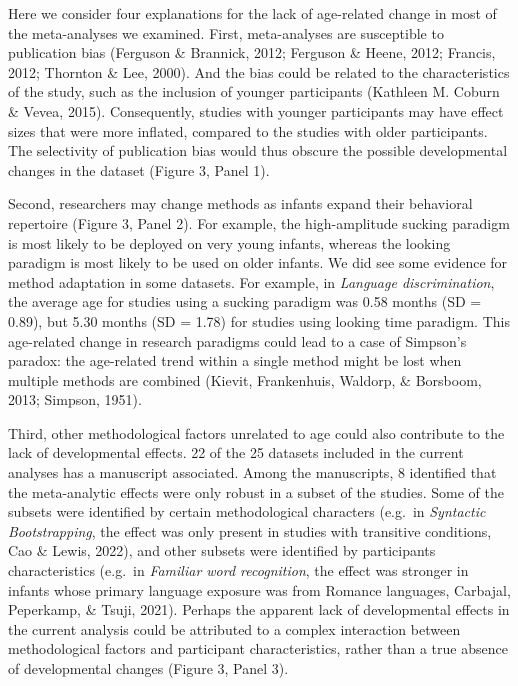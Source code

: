 \documentclass[
  man]{apa6}
\begin{document}
Here we consider four explanations for the lack of age-related change in most of the meta-analyses we examined. First, meta-analyses are susceptible to publication bias (Ferguson \& Brannick, 2012; Ferguson \& Heene, 2012; Francis, 2012; Thornton \& Lee, 2000). And the bias could be related to the characteristics of the study, such as the inclusion of younger participants (Kathleen M. Coburn \& Vevea, 2015). Consequently, studies with younger participants may have effect sizes that were more inflated, compared to the studies with older participants. The selectivity of publication bias would thus obscure the possible developmental changes in the dataset (Figure 3, Panel 1).

Second, researchers may change methods as infants expand their behavioral repertoire (Figure 3, Panel 2). For example, the high-amplitude sucking paradigm is most likely to be deployed on very young infants, whereas the looking paradigm is most likely to be used on older infants. We did see some evidence for method adaptation in some datasets. For example, in \emph{Language discrimination}, the average age for studies using a sucking paradigm was 0.58 months (SD = 0.89), but 5.30 months (SD = 1.78) for studies using looking time paradigm. This age-related change in research paradigms could lead to a case of Simpson's paradox: the age-related trend within a single method might be lost when multiple methods are combined (Kievit, Frankenhuis, Waldorp, \& Borsboom, 2013; Simpson, 1951).

Third, other methodological factors unrelated to age could also contribute to the lack of developmental effects. 22 of the 25 datasets included in the current analyses has a manuscript associated. Among the manuscripts, 8 identified that the meta-analytic effects were only robust in a subset of the studies. Some of the subsets were identified by certain methodological characters (e.g.~in \emph{Syntactic Bootstrapping}, the effect was only present in studies with transitive conditions, Cao \& Lewis, 2022), and other subsets were identified by participants characteristics (e.g.~in \emph{Familiar word recognition}, the effect was stronger in infants whose primary language exposure was from Romance languages, Carbajal, Peperkamp, \& Tsuji, 2021). Perhaps the apparent lack of developmental effects in the current analysis could be attributed to a complex interaction between methodological factors and participant characteristics, rather than a true absence of developmental changes (Figure 3, Panel 3).
\end{document}
